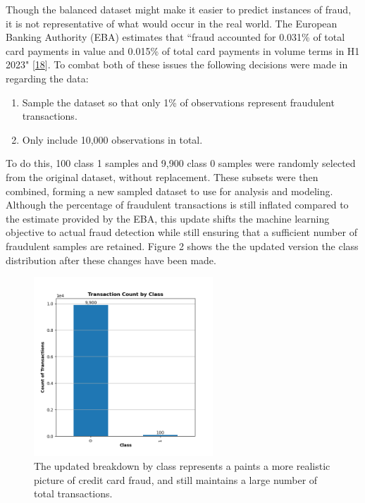 \documentclass[11pt, oneside]{article}   	%
\begin{document}
Though the balanced dataset might make it easier to predict instances of fraud, it is not representative of what would occur in the real world. The European Banking Authority (EBA) estimates that ``fraud accounted for 0.031\% of total card payments in value and 0.015\% of total card payments in volume terms in H1 2023" [\href{https://www.eba.europa.eu/sites/default/files/2024-08/465e3044-4773-4e9d-8ca8-b1cd031295fc/EBA_ECB\%202024\%20Report\%20on\%20Payment\%20Fraud.pdf}{18}]. To combat both of these issues the following decisions were made in regarding the data:

\begin{enumerate}
	\item{Sample the dataset so that only 1\% of observations represent fraudulent transactions.}
	\item{Only include 10,000 observations in total.}
\end{enumerate}

To do this, 100 class 1 samples and 9,900 class 0 samples were randomly selected from the original dataset, without replacement. These subsets were then combined, forming a new sampled dataset to use for analysis and modeling. Although the percentage of fraudulent transactions is still inflated compared to the estimate provided by the EBA, this update shifts the machine learning objective to actual fraud detection while still ensuring that a sufficient number of fraudulent samples are retained. Figure 2 shows the the updated version the class distribution after these changes have been made.\\

\begin{figure}[h!]
	\centering
	\includegraphics[width=0.6\textwidth]{figures/fig_2.png}
	\captionsetup{font=small} 
	\caption{The updated breakdown by class represents a paints a more realistic picture of credit card fraud, and still maintains a large number of total transactions.}
	\label{fig2}
\end{figure}
\end{document}
